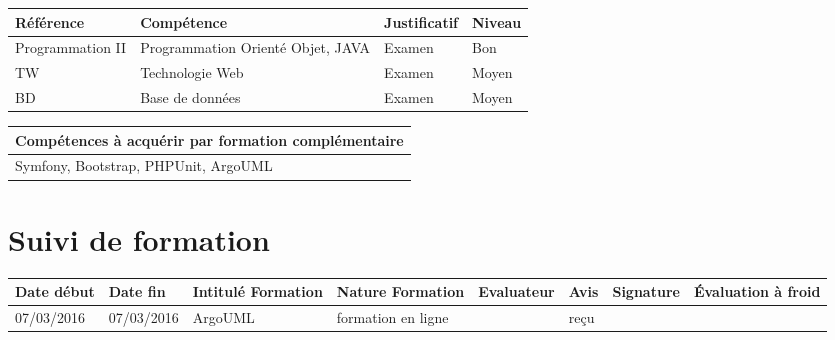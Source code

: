 \documentclass[11pt]{article}
\begin{document}
\begin{table}[!hp]
\centering
	\begin{tabularx}{\linewidth}{|X|X|X|X|}
	\hline
	\rowcolor{gray!40} Référence & Compétence & Justificatif & Niveau \\
	
	\hline
	 Programmation II & Programmation Orienté Objet, JAVA & Examen & 			Bon \\
	 \hline
	 TW & Technologie Web & Examen & Moyen \\
	 \hline
	 BD & Base de données & Examen & Moyen \\
	\end{tabularx}
\end{table}

\begin{table}[!hp]
\centering
	\begin{tabularx}{\linewidth}{|X|}
	\hline
	\rowcolor{gray!40} Compétences à acquérir par formation complémentaire \\
	\hline
	Symfony, Bootstrap, PHPUnit, ArgoUML  \\
	\hline
	\end{tabularx}
\end{table}

\section*{\large Suivi de formation}

\centering
	\begin{longtable}{|p{1.9cm}|p{1.9cm}|p{1.9cm}|p{1.9cm}|p{1cm}|p{1.5cm}|p{1.5cm}|p{1.5cm}|}
	\hline
	\rowcolor{gray!40} \tiny Date début & \tiny Date fin & \tiny Intitulé Formation & \tiny Nature Formation & \tiny Evaluateur & \tiny Avis & \tiny Signature & \tiny Évaluation à froid \\
	\hline
	07/03/2016 &07/03/2016 &ArgoUML &formation en ligne &\Julie &reçu & & \\
	\hline
	\end{longtable}
\end{document}
